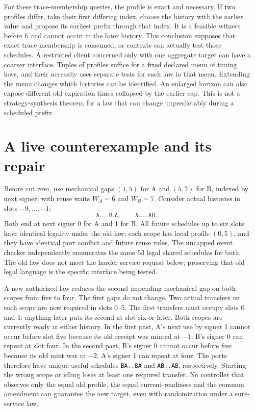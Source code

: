 \documentclass[11pt]{article}
\begin{document}
For these trace-membership queries, the profile is exact and necessary.
If two profiles differ, take their first differing index, choose the
history with the earlier value and propose its earliest prefix through
that index. It is a feasible witness before \(h\) and cannot occur in
the later history. This conclusion supposes that exact trace membership
is consumed, or contexts can actually test those schedules. A restricted
client concerned only with one aggregate target can have a coarser
interface. Tuples of profiles suffice for a fixed declared menu of
timing laws, and their necessity uses separate tests for each law in
that menu. Extending the menu changes which histories can be identified.
An enlarged horizon can also expose different old expiration times
collapsed by the earlier cap. This is not a strategy-synthesis theorem
for a law that can change unpredictably during a scheduled prefix.

\section{A live counterexample and its repair}
Before cut zero, use mechanical gaps \((1,5)\) for A and \((5,2)\) for B,
indexed by next signer, with reuse waits \(W_A=6\) and \(W_B=7\).
Consider actual histories in slots \(-9,\ldots,-1\):
\[
 \texttt{A.....B.A},\qquad \texttt{A.....AB.}.
\]
Both end at next signer 0 for A and 1 for B. All future schedules
up to six slots have identical legality under the old law: each
scope has local profile \((0,5)\), and they have identical port
conflict and future reuse rules. The uncapped event checker
independently enumerates the same 53 legal shared schedules for both.
The old law does not meet the harder service request below; preserving
that old legal language is the specific interface being tested.

A new authorized law reduces the second impending mechanical gap
on both scopes from five to four. The first gaps do not change.
Two actual transfers on each scope are now required in slots 0--5.
The first transfers must occupy slots 0 and 1: anything later puts its
second at slot six or later. Both scopes are currently ready in either
history. In the first past, A's next use by signer 1 cannot occur
before slot five because its old receipt was minted at \(-1\); B's
signer 0 can repeat at slot four. In the second past, B's signer 0
cannot occur before five because its old mint was at \(-2\);
A's signer 1 can repeat at four. The ports therefore have unique
useful schedules \texttt{BA..BA} and \texttt{AB..AB}, respectively.
Starting the wrong scope or idling loses at least one required
transfer. No controller that observes only the equal old profile,
the equal current readiness and the common amendment can guarantee
the new target, even with randomization under a sure-service law.
\end{document}
